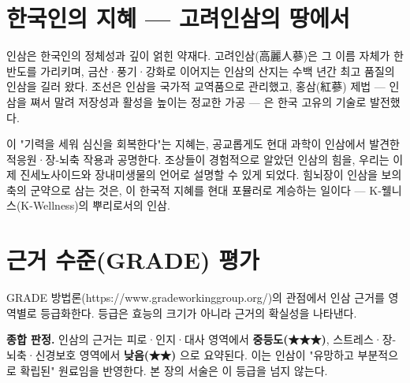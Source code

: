 \documentclass[11pt,oneside]{book}
\begin{document}
\section{한국인의 지혜 — 고려인삼의 땅에서}
인삼은 한국인의 정체성과 깊이 얽힌 약재다. 고려인삼(高麗人蔘)은 그 이름 자체가 한반도를 가리키며, 금산·풍기·강화로 이어지는 인삼의 산지는 수백 년간 최고 품질의 인삼을 길러 왔다. 조선은 인삼을 국가적 교역품으로 관리했고, 홍삼(紅蔘) 제법 — 인삼을 쪄서 말려 저장성과 활성을 높이는 정교한 가공 — 은 한국 고유의 기술로 발전했다.

이 "기력을 세워 심신을 회복한다"는 지혜는, 공교롭게도 현대 과학이 인삼에서 발견한 적응원·장-뇌축 작용과 공명한다. 조상들이 경험적으로 알았던 인삼의 힘을, 우리는 이제 진세노사이드와 장내미생물의 언어로 설명할 수 있게 되었다. 힘뇌장이 인삼을 보의 축의 군약으로 삼는 것은, 이 한국적 지혜를 현대 포뮬러로 계승하는 일이다 — K-웰니스(K-Wellness)의 뿌리로서의 인삼.

\section{근거 수준(GRADE) 평가}
GRADE 방법론(https://www.gradeworkinggroup.org/)의 관점에서 인삼 근거를 영역별로 등급화한다. 등급은 효능의 크기가 아니라 근거의 확실성을 나타낸다.

\vspace{2pt}\vspace{3pt}

\textbf{종합 판정.} 인삼의 근거는 피로·인지·대사 영역에서 \textbf{중등도(★★★)}, 스트레스·장-뇌축·신경보호 영역에서 \textbf{낮음(★★)} 으로 요약된다. 이는 인삼이 "유망하고 부분적으로 확립된" 원료임을 반영한다. 본 장의 서술은 이 등급을 넘지 않는다.
\end{document}
